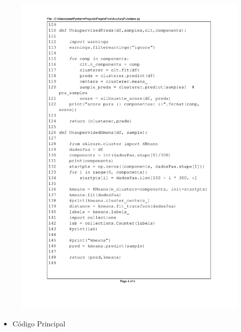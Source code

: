 \begin{figure}[H]
\centering
\includegraphics[scale=0.9]{01_Pre_textuais/code/analisa4.pdf}
\end{figure}

 \newpage







\begin{itemize}
    \item Código Principal
\end{itemize}

